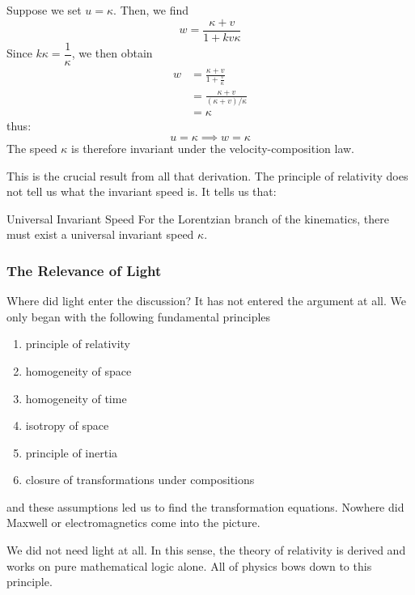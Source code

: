		Suppose we set $u = \kappa$. Then, we find
		\begin{equation}
		    w = \frac{\kappa + v}{1+kv\kappa} 
		\end{equation}
		Since $k\kappa = \dfrac{1}{\kappa}$, we then obtain
		\begin{align*}
			w &= \frac{\kappa + v}{1 + \frac{v}{\kappa}} \\
			  &= \frac{\kappa + v}{(\kappa + v)/\kappa} \\
			  &= \kappa
		\end{align*}
		thus:
		\begin{equation}
		    u = \kappa \implies w = \kappa
		\end{equation}
		The speed $\kappa$ is therefore invariant under the velocity-composition law. 

		This is the crucial result from all that derivation.
		The principle of relativity does not tell us what the invariant speed is. It 
		tells us that:
		\begin{theorem}{Universal Invariant Speed}
			\hspace{2em}For the Lorentzian branch of the kinematics, there must exist a 
			universal invariant speed $\kappa$.
		\end{theorem}
		\newpage	
	\subsubsection{The Relevance of Light}
		Where did light enter the discussion? It has not entered the argument at all. We only 
		began with the following fundamental principles
		\begin{enumerate}
		    \item principle of relativity
			\item homogeneity of space
			\item homogeneity of time
			\item isotropy of space
			\item principle of inertia
			\item closure of transformations under compositions
		\end{enumerate}
		and these assumptions led us to find the transformation equations. Nowhere did 
		Maxwell or electromagnetics come into the picture.

		We did not need light at all. In this sense, the theory of relativity is derived
		and works on pure mathematical logic alone. All of physics bows down to this principle.

